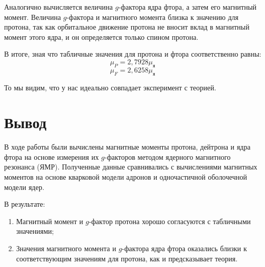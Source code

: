 \documentclass[a4paper, 12pt]{article}%
\begin{document}
Аналогично вычисляется величина $g$-фактора ядра фтора, а затем его магнитный момент. Величина $g$-фактора и магнитного момента близка к значению для протона, так как орбитальное движение протона не вносит вклад в магнитный момент этого ядра, и он определяется только спином протона.

В итоге, зная что табличные значения для протона и фтора соответственно равны:
\[\mu_P = 2,7928 \mu_{\text{я}}\]
\[\mu_F = 2,6258 \mu_{\text{я}}\]

То мы видим, что у нас идеально совпадает эксперимент с теорией.
\section{Вывод}
В ходе работы были вычислены магнитные моменты протона, дейтрона и ядра фтора на основе измерения их $g$-факторов методом ядерного магнитного резонанса (ЯМР). Полученные данные сравнивались с вычислениями магнитных моментов на основе кварковой модели адронов и одночастичной оболочечной модели ядер.

В результате:
\begin{enumerate}
\item 
Магнитный момент и $g$-фактор протона хорошо согласуются с табличными значениями;
\item
Значения магнитного момента и $g$-фактора ядра фтора оказались близки к соответствующим значениям для протона, как и предсказывает теория.


\end{enumerate}
\end{document}
